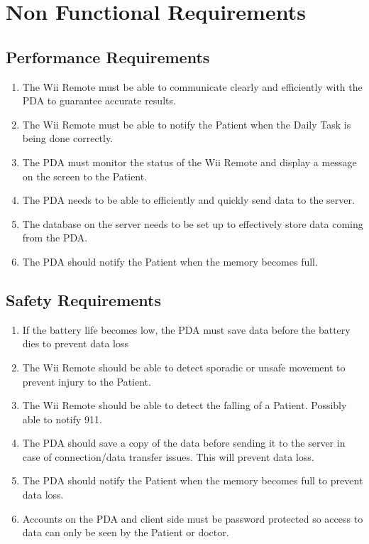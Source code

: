 \documentclass{article}
\begin{document}
\section{Non Functional Requirements}
\subsection{Performance Requirements }
\begin{enumerate}
\item The Wii Remote must be able to communicate clearly and efficiently with the PDA to guarantee accurate results.
\item The Wii Remote must be able to notify the Patient when the Daily Task is being done correctly.
\item The PDA must monitor the status of the Wii Remote and display a message on the screen to the Patient.
\item The PDA needs to be able to efficiently and quickly send data to the server. 
\item The database on the server needs to be set up to effectively store data coming from the PDA.
\item The PDA should notify the Patient when the memory becomes full.

\end{enumerate}

\subsection {Safety Requirements}
\begin{enumerate}
\item If the battery life becomes low, the PDA must save data before the battery dies to prevent data loss
\item The Wii Remote should be able to detect sporadic or unsafe movement to prevent injury to the Patient.
\item The Wii Remote should be able to detect the falling of a Patient. Possibly able to notify 911.
\item The PDA should save a copy of the data before sending it to the server in case of connection/data transfer issues. This will prevent data loss.
\item The PDA should notify the Patient when the memory becomes full to prevent data loss. 
\item Accounts on the PDA and client side must be password protected so access to data can only be seen by the Patient or doctor. 
\end{enumerate}
\end{document}
